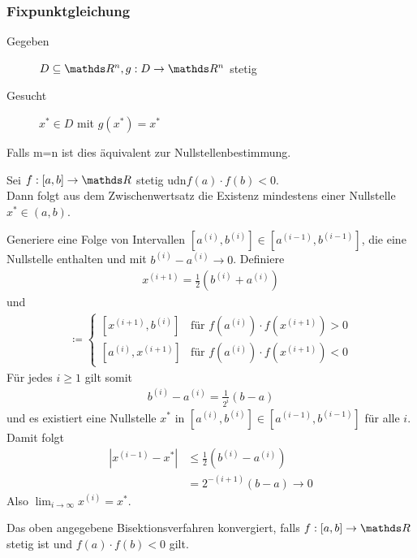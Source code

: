 \subsubsection{Fixpunktgleichung}
\begin{description}
	\item[Gegeben]   $D\subseteq \R^n, g: D\rightarrow \R^n$ stetig
	\item[Gesucht]      $x^{*}\in D $ mit $g(x^{*}) = x^{*}$
\end{description}
Falls m=n ist dies äquivalent zur Nullstellenbestimmung.

Sei $f:[a,b]\rightarrow \R $ stetig udn$f(a) \cdot f(b) <0$.\\
Dann folgt aus dem Zwischenwertsatz die Existenz
mindestens einer Nullstelle $x^{*}\in (a,b)$.


Generiere eine Folge von Intervallen
$[a^{(i)}, b^{(i)}]\in  [a^{(i-1)}, b^{(i-1)}] $,
die eine Nullstelle enthalten und mit $b^{(i)}-a^{(i)} \longrightarrow 0$.
Definiere
\begin{gather}
x^{(i+1)}= \frac{1}{2}(b^{(i)}+a^{(i)})
\label{V.1.1}
\end{gather}
und
\begin{gather}
[a^{(i+1)}, b^{(i+1)}] \coloneqq \begin{cases}
[x^{(i+1)}, b^{(i)}] & \text{für } f(a^{(i)})\cdot f(x^{(i+1)}) > 0 \\
[a^{(i)}, x^{(i+1)}] & \text{für } f(a^{(i)})\cdot f(x^{(i+1)}) < 0
\end{cases}
\label{V.1.2}
\end{gather}
Für jedes $i\geq 1$ gilt somit
\begin{gather*}
b^{(i)}-a^{(i)} = \frac{1}{2^i}(b-a)
\end{gather*}
und es existiert eine Nullstelle $x^{*}$ in $[a^{(i)}, b^{(i)}]\in  [a^{(i-1)}, b^{(i-1)}] $
für alle $i$. \\
Damit folgt
\begin{align*}
|x^{(i-1)}-x^{*}| &\leq \frac{1}{2}(b^{(i)}-a^{(i)}) \\
&=  2^{-(i+1)} (b-a) \longrightarrow 0
\end{align*}
Also $\lim_{i\rightarrow \infty}x^{(i)} = x^{*}$.


\begin{Kore}
	Das oben angegebene Bisektionsverfahren konvergiert, falls
	$f:[a,b]\rightarrow \R $ stetig ist und 
	$f(a)\cdot f(b) <0$ gilt.
\end{Kore}

